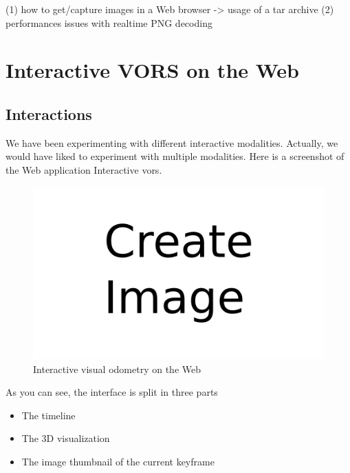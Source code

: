 (1) how to get/capture images in a Web browser -> usage of a tar archive
(2) performances issues with realtime PNG decoding


\section{Interactive VORS on the Web}%
\label{sec:interactive-vors}


\subsection{Interactions}%
\label{sub:interactions}

We have been experimenting with different interactive modalities.
Actually, we would have liked to experiment with multiple modalities.
Here is a screenshot of the Web application Interactive vors.

\begin{figure}[h]
	\centering
	\includegraphics[width=\linewidth]{assets/img/todo.png}
	\caption{Interactive visual odometry on the Web}%
	\label{fig:interactive_vors}
\end{figure}

As you can see, the interface is split in three parts

\begin{itemize}
	\item The timeline
	\item The 3D visualization
	\item The image thumbnail of the current keyframe
\end{itemize}

